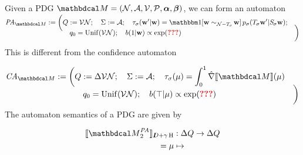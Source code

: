 \documentclass[the-pdg-manual.tex]{subfiles}
\begin{document}
    
    \def\???{{\color{red}\textbf{???}}}
    \begin{constr}
        Given a PDG $\dg M = (\N, \Ar, \V, \mathcal P, \balpha, \bbeta)$, 
        we can form an automaton
        \begin{align*}
            \mathit{PA}_{\dg M} :=
            \smash{\bigg(}&
            Q := \V\N;\quad
                \Sigma := \Ar;  \quad
                \tau_{\sigma}(\mat w' | \mat w) = 
                    \mathbbm1[\mat w \sim_{\N-\Tgt \sigma}\!\mat w]\,
                    p_\sigma(\Tgt \sigma \mat w' | \Src \sigma \mat w);
                \\&\quad
                q_0 = \mathrm{Unif}(\V\N); \quad
                b(1|\mat w) \propto \exp(\???) &
            \smash{\bigg)}
        \end{align*}
    \end{constr}
    
    This is different from the confidence automaton 
    \begin{constr}
        \begin{align*}
            \mathit{CA}_{\dg M} :=
            \smash{\bigg(}&
            Q := \Delta\V\N;\quad
                \Sigma := \Ar;  \quad
                \tau_{\sigma}(\mu) = \int_{0}^{1} \hat\nabla \bbr{\dg M}(\mu) 
                \\&\quad
                q_0 = \mathrm{Unif}(\V\N); \quad
                b(\top|\mu) \propto \exp(\???) &
            \smash{\bigg)}
        \end{align*}
    \end{constr}
    
    The automaton semantics of a PDG are given by 
    
    \begin{claim}
        \begin{align*}
            \bbr{ {\dg M}_{2}^{\mathit{PA}} }_{\thickD + \gamma \H} &: \Delta Q \to \Delta Q \\
                = \mu &\mapsto 
        \end{align*}
    \end{claim}
\end{document}
